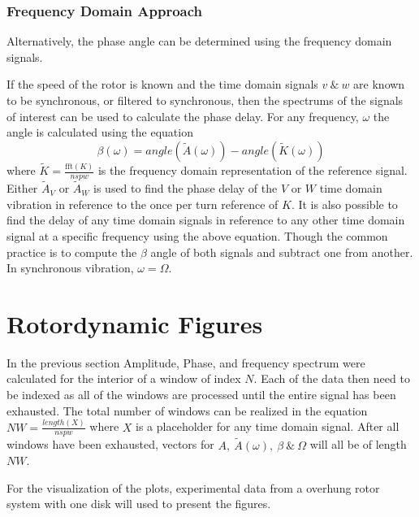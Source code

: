 \subsubsection{Frequency Domain Approach}
Alternatively, the phase angle can be determined using the frequency domain signals.\par 
If the speed of the rotor is known and the time domain signals $ v\ \&\ w $ are known to be synchronous, or filtered to synchronous, then the spectrums of the signals of interest can be used to calculate the phase delay. For any frequency, $ \omega $ the angle is calculated using the equation
\begin{equation*}
\beta(\omega)=angle(\tilde{A}(\omega))-angle(\tilde{K}(\omega))
\end{equation*}
where $ \tilde{K} = \frac{\text{fft}(K)}{nspw} $ is the frequency domain representation of the reference signal. Either $ \tilde{A}_V $ or $ \tilde{A}_W $ is used to find the phase delay of the $ V $ or $ W $ time domain vibration in reference to the once per turn reference of $ K $. It is also possible to find the delay of any time domain signals in reference to any other time domain signal at a specific frequency using the above equation. Though the common practice is to compute the $ \beta $ angle of both signals and subtract one from another. In synchronous vibration, $ \omega=\Omega $.\par
\section{Rotordynamic Figures}\label{ExperimentalPlots}
In the previous section Amplitude, Phase, and frequency spectrum were calculated for the interior of a window of index $ N $. Each of the data then need to be indexed as all of the windows are processed until the entire signal has been exhausted. The total number of windows can be realized in the equation $ NW=\frac{length(X)}{nspw} $ where $ X $ is a placeholder for any time domain signal. After all windows have been exhausted, vectors for $ A,\ \tilde{A}(\omega),\ \beta\ \&\ \Omega $ will all be of length $ NW $.\par 
For the visualization of the plots, experimental data from a overhung rotor system with one disk will used to present the figures.\par
